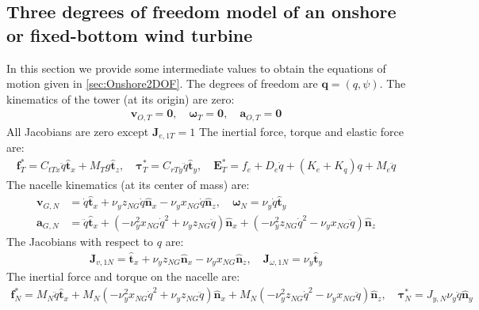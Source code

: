 \documentclass[wes, manuscript]{copernicus}
\renewcommand{\v}[1]{\boldsymbol{#1}}
\begin{document}
\subsection{Three degrees of freedom model of an onshore or fixed-bottom wind turbine}
\label{sec:Onshore2DOFEq}
In this section we provide some intermediate values to obtain the equations of motion given in \autoref{sec:Onshore2DOF}. The degrees of freedom are $\v{q}=(q,\psi)$.
The kinematics of the tower (at its origin) are zero:
\begin{align}
\v{v}_{O,T} = \v{0}
, \quad
\v{\omega}_{T} = \v{0}
, \quad
\v{a}_{O,T} = \v{0}
\end{align}
All Jacobians are zero except $\v{J}_{e,1T}=1$
The inertial force, torque and elastic force are:
\begin{align}
\v{f}^*_T = C_{t Tx} \ddot{q}\v{\hat{t}}_x + M_{T} g\v{\hat{t}}_z
    ,\quad
\v{\tau}^*_T =  C_{r Ty} \ddot{q}\v{\hat{t}}_y
    ,\quad
\v{E}_T^*= f_e + D_{e} \dot{q} + (K_{e}+K_q) q + M_{e} \ddot{q}
\end{align}
The nacelle kinematics (at its center of mass) are:
\begin{align}
\v{v}_{G,N} &=  \dot{q}\v{\hat{t}}_x + \nu_y z_{NG} \dot{q}\v{\hat{n}}_x -  \nu_y x_{NG} \dot{q}\v{\hat{n}}_z
,\quad
\v{\omega}_{N} = \nu_y \dot{q}\v{\hat{t}}_y
\\
\v{a}_{G,N} &=  \ddot{q}\v{\hat{t}}_x + (- \nu_y^{2} x_{NG} \dot{q}^{2} + \nu_y z_{NG} \ddot{q})\v{\hat{n}}_x + (- \nu_y^{2} z_{NG} \dot{q}^{2} - \nu_y x_{NG} \ddot{q})\v{\hat{n}}_z
\end{align}
The Jacobians with respect to $q$ are:
\begin{align}
\v{J}_{v,1N}=\v{\hat{t}}_x + \nu_y z_{NG}\v{\hat{n}}_x -  \nu_y x_{NG}\v{\hat{n}}_z
, \quad
\v{J}_{\omega,1N}=\nu_y\v{\hat{t}}_y
\end{align}
The inertial force and torque on the nacelle are:
\begin{align}
\v{f}^*_N = 
M_N  \ddot{q}\v{\hat{t}}_x + M_N \left(- \nu_y^{2} x_{NG} \dot{q}^{2} + \nu_y z_{NG} \ddot{q}\right)\v{\hat{n}}_x + M_N \left(- \nu_y^{2} z_{NG} \dot{q}^{2} - \nu_y x_{NG} \ddot{q}\right)\v{\hat{n}}_z
    ,\quad
\v{\tau}_N^* = 
J_{y,N} \nu_y \ddot{q}\v{\hat{n}}_y
\end{align}
\end{document}
